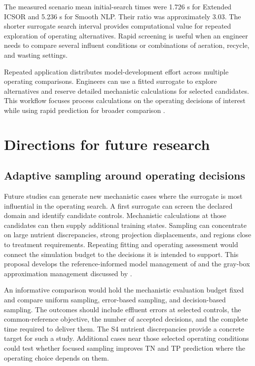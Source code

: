 The measured scenario mean initial-search times were 1.726 s for Extended ICSOR and 5.236 s for Smooth NLP. Their ratio was approximately 3.03. The shorter surrogate search interval provides computational value for repeated exploration of operating alternatives. Rapid screening is useful when an engineer needs to compare several influent conditions or combinations of aeration, recycle, and wasting settings.

Repeated application distributes model-development effort across multiple operating comparisons. Engineers can use a fitted surrogate to explore alternatives and reserve detailed mechanistic calculations for selected candidates. This workflow focuses process calculations on the operating decisions of interest while using rapid prediction for broader comparison \citep{BhosekarIerapetritou2018,Bliek2023}.

\section{Directions for future research}

\subsection{Adaptive sampling around operating decisions}

Future studies can generate new mechanistic cases where the surrogate is most influential in the operating search. A first surrogate can screen the declared domain and identify candidate controls. Mechanistic calculations at those candidates can then supply additional training states. Sampling can concentrate on large nutrient discrepancies, strong projection displacements, and regions close to treatment requirements. Repeating fitting and operating assessment would connect the simulation budget to the decisions it is intended to support. This proposal develops the reference-informed model management of \citet{Alexandrov1998} and the gray-box approximation management discussed by \citet{Hameed2026}.

An informative comparison would hold the mechanistic evaluation budget fixed and compare uniform sampling, error-based sampling, and decision-based sampling. The outcomes should include effluent errors at selected controls, the common-reference objective, the number of accepted decisions, and the complete time required to deliver them. The S4 nutrient discrepancies provide a concrete target for such a study. Additional cases near those selected operating conditions could test whether focused sampling improves TN and TP prediction where the operating choice depends on them.

